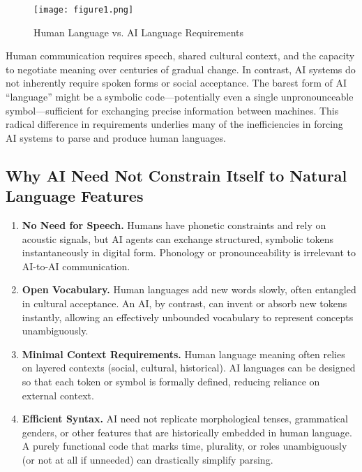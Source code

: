 \documentclass{article} %
\begin{document}
\begin{figure}[h]
    \centering
    \texttt{[image: figure1.png]}
    \caption{Human Language vs. AI Language Requirements}
    \label{fig:language-requirements}
\end{figure}

Human communication requires speech, shared cultural context, and the capacity to negotiate meaning over centuries of gradual change. In contrast, AI systems do not inherently require spoken forms or social acceptance. The barest form of AI “language” might be a symbolic code—potentially even a single unpronounceable symbol—sufficient for exchanging precise information between machines. This radical difference in requirements underlies many of the inefficiencies in forcing AI systems to parse and produce human languages.



\subsection{Why AI Need Not Constrain Itself to Natural Language Features}

\begin{enumerate}
    \item \textbf{No Need for Speech.} Humans have phonetic constraints and rely on acoustic signals, but AI agents can exchange structured, symbolic tokens instantaneously in digital form. Phonology or pronounceability is irrelevant to AI-to-AI communication.

    \item \textbf{Open Vocabulary.} Human languages add new words slowly, often entangled in cultural acceptance. An AI, by contrast, can invent or absorb new tokens instantly, allowing an effectively unbounded vocabulary to represent concepts unambiguously.

    \item \textbf{Minimal Context Requirements.} Human language meaning often relies on layered contexts (social, cultural, historical). AI languages can be designed so that each token or symbol is formally defined, reducing reliance on external context.

    \item \textbf{Efficient Syntax.} AI need not replicate morphological tenses, grammatical genders, or other features that are historically embedded in human language. A purely functional code that marks time, plurality, or roles unambiguously (or not at all if unneeded) can drastically simplify parsing.
\end{enumerate}
\end{document}
